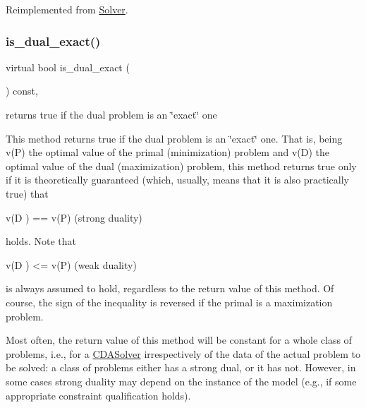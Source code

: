 Reimplemented from \mbox{\hyperlink{class_s_m_spp__di__unipi__it_1_1_solver_ae281b6699b0707a5cdc1e82b76d26c09}{Solver}}.

\mbox{\label{class_s_m_spp__di__unipi__it_1_1_c_d_a_solver_a402db4cab5024abd480ae2186cf467cc}} 
\subsubsection{\texorpdfstring{is\+\_\+dual\+\_\+exact()}{is\_dual\_exact()}}
{\footnotesize\ttfamily virtual bool is\+\_\+dual\+\_\+exact (\begin{DoxyParamCaption}\item[{void}]{ }\end{DoxyParamCaption}) const\hspace{0.3cm}{\ttfamily [inline]}, {\ttfamily [virtual]}}



returns true if the dual problem is an \char`\"{}exact\char`\"{} one 

This method returns true if the dual problem is an \char`\"{}exact\char`\"{} one. That is, being v(\+P) the optimal value of the primal (minimization) problem and v(\+D) the optimal value of the dual (maximization) problem, this method returns true only if it is theoretically guaranteed (which, usually, means that it is also practically true) that \begin{DoxyVerb}  v(D ) == v(P)      (strong duality)
\end{DoxyVerb}


holds. Note that \begin{DoxyVerb}  v(D ) <= v(P)      (weak duality)
\end{DoxyVerb}


is always assumed to hold, regardless to the return value of this method. Of course, the sign of the inequality is reversed if the primal is a maximization problem.

Most often, the return value of this method will be constant for a whole class of problems, i.\+e., for a \mbox{\hyperlink{class_s_m_spp__di__unipi__it_1_1_c_d_a_solver}{C\+D\+A\+Solver}} irrespectively of the data of the actual problem to be solved\+: a class of problems either has a strong dual, or it has not. However, in some cases strong duality may depend on the instance of the model (e.\+g., if some appropriate constraint qualification holds).

